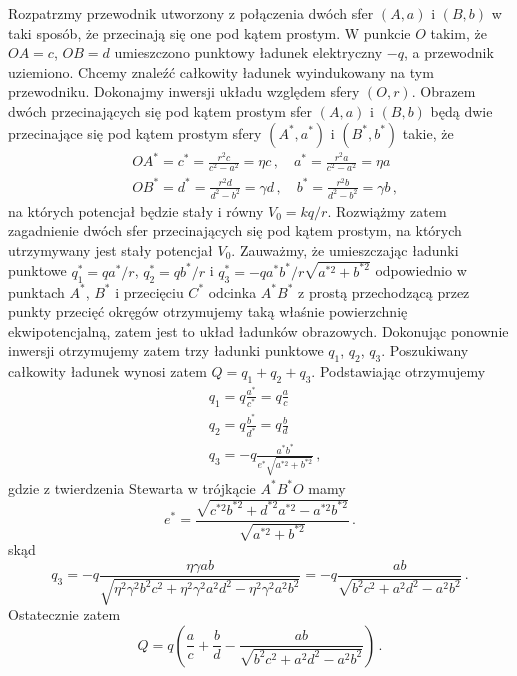 \documentclass[../main.tex]{subfiles}
\begin{document}
\begin{enumerate}
    Rozpatrzmy przewodnik utworzony z połączenia dwóch sfer \((A,a)\) i \((B,b)\) w taki sposób, że przecinają się one pod kątem prostym. W punkcie \(O\) takim, że \(OA=c\), \(OB=d\) umieszczono punktowy ładunek elektryczny \(-q\), a przewodnik uziemiono. Chcemy znaleźć całkowity ładunek wyindukowany na tym przewodniku. Dokonajmy inwersji układu względem sfery \((O,r)\). Obrazem dwóch przecinających się pod kątem prostym sfer \((A,a)\) i \((B,b)\) będą dwie przecinające się pod kątem prostym sfery \((A^*,a^*)\) i \((B^*,b^*)\) takie, że
    \begin{equation*}
    \begin{split}
        &OA^*=c^*=\frac{r^2c}{c^2-a^2}=\eta c\,,\quad a^*=\frac{r^2a}{c^2-a^2}=\eta a\\
        &OB^*=d^*=\frac{r^2d}{d^2-b^2}=\gamma d\,,\quad b^*=\frac{r^2b}{d^2-b^2}=\gamma b\,,
    \end{split}
    \end{equation*}
    na których potencjał będzie stały i równy \(V_0=kq/r\). Rozwiążmy zatem zagadnienie dwóch sfer przecinających się pod kątem prostym, na których utrzymywany jest stały potencjał \(V_0\). Zauważmy, że umieszczając ładunki punktowe \(q_1^*=qa^*/r\), \(q_2^*=qb^*/r\) i \(q_3^*=-qa^*b^*/r\sqrt{a^{*2}+b^{*2}}\) odpowiednio w punktach \(A^*\), \(B^*\) i przecięciu \(C^*\) odcinka \(A^*B^*\) z prostą przechodzącą przez punkty przecięć okręgów otrzymujemy taką właśnie powierzchnię ekwipotencjalną, zatem jest to układ ładunków obrazowych. Dokonując ponownie inwersji otrzymujemy zatem trzy ładunki punktowe \(q_1\), \(q_2\), \(q_3\). Poszukiwany całkowity ładunek wynosi zatem \(Q=q_1+q_2+q_3\). Podstawiając otrzymujemy
    \begin{equation*}
    \begin{split}
        &q_1=q\frac{a^*}{c^*}=q\frac{a}{c}\\
        &q_2=q\frac{b^*}{d^*}=q\frac{b}{d}\\
        &q_3=-q\frac{a^*b^*}{e^*\sqrt{a^{*2}+b^{*2}}}\,,
    \end{split}
    \end{equation*}
    gdzie z twierdzenia Stewarta w trójkącie \(A^*B^*O\) mamy
    \begin{equation*}
        e^*=\frac{\sqrt{c^{*2}b^{*2}+d^{*2}a^{*2}-a^{*2}b^{*2}}}{\sqrt{a^{*2}+b^{*2}}}\,.
    \end{equation*}
     skąd
    \begin{equation*}
        q_3=-q\frac{\eta\gamma ab}{\sqrt{\eta^2\gamma^2b^2c^2+\eta^2\gamma^2a^2d^2-\eta^2\gamma^2a^2b^2}}=-q\frac{ab}{\sqrt{b^2c^2+a^2d^2-a^2b^2}}\,.
    \end{equation*}
    Ostatecznie zatem
    \begin{equation*}
        Q=q\left(\frac{a}{c}+\frac{b}{d}-\frac{ab}{\sqrt{b^2c^2+a^2d^2-a^2b^2}}\right)\,.
    \end{equation*}


\end{enumerate}
\end{document}
